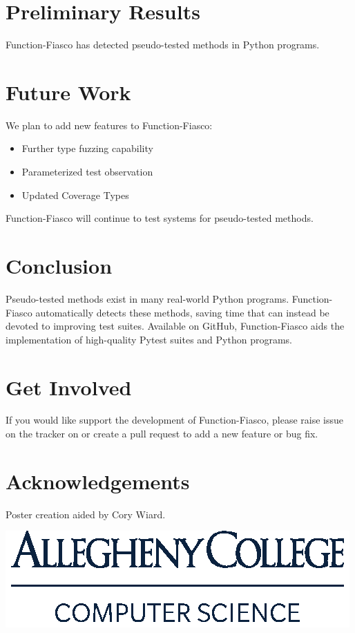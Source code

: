 \documentclass[a0paper,fleqn]{betterposter}
\begin{document}
{%

\section{Preliminary Results}



Function-Fiasco has detected pseudo-tested methods in Python programs.

\section{Future Work}
%
We plan to add new features to Function-Fiasco: \\

\begin{itemize}[leftmargin=*]

\item{Further type fuzzing capability}
%
\item{Parameterized test observation}
%
\item{Updated Coverage Types}

\end{itemize}

\vspace{1em}
%
Function-Fiasco will continue to test systems for pseudo-tested methods.

\section{Conclusion}
%
Pseudo-tested methods exist in many real-world Python programs.
%
Function-Fiasco automatically detects these methods, saving time that can
instead be devoted to improving test suites.
%
Available on GitHub, Function-Fiasco aids the implementation of high-quality
Pytest suites and Python programs.

\section{Get Involved}
%
If you would like support the development of Function-Fiasco, please raise issue
on the tracker on or create a pull request to add a new feature or bug fix.
%
\vfill

\section{Acknowledgements}
%
Poster creation aided by Cory Wiard.\\

\vspace*{.5in}

\includegraphics[width=\textwidth]{img/ComputerScience-Stack}

}
\end{document}

